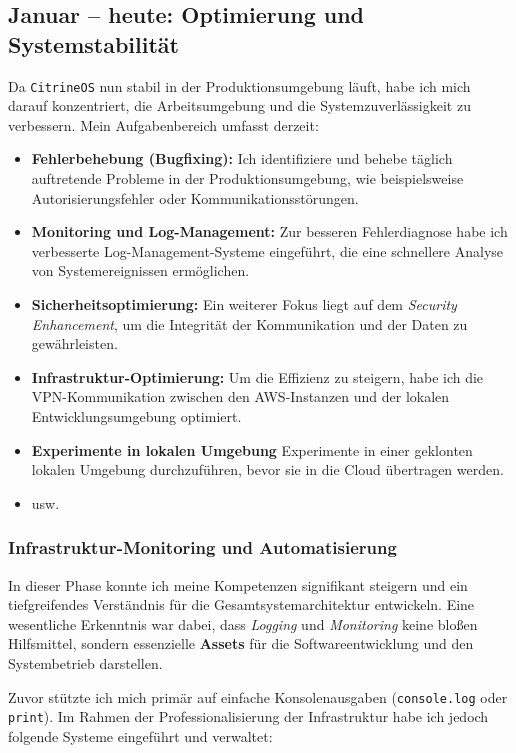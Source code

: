 \documentclass[12pt,a4paper]{report}
\begin{document}
\subsection{ Januar -- heute: Optimierung und Systemstabilität } 
Da \texttt{CitrineOS} nun stabil in der Produktionsumgebung läuft,
 habe ich mich darauf konzentriert, die Arbeitsumgebung und die Systemzuverlässigkeit zu verbessern.
    Mein Aufgabenbereich umfasst derzeit: 
    \begin{itemize} 
        \item \textbf{Fehlerbehebung (Bugfixing):} Ich identifiziere und behebe täglich auftretende Probleme in der Produktionsumgebung, wie beispielsweise Autorisierungsfehler oder Kommunikationsstörungen. 
        \item \textbf{Monitoring und Log-Management:} Zur besseren Fehlerdiagnose habe ich verbesserte Log-Management-Systeme eingeführt, die eine schnellere Analyse von Systemereignissen ermöglichen. 
        \item \textbf{Sicherheitsoptimierung:} Ein weiterer Fokus liegt auf dem \textit{Security Enhancement}, um die Integrität der Kommunikation und der Daten zu gewährleisten. 
        \item \textbf{Infrastruktur-Optimierung:} Um die Effizienz zu steigern, habe ich die VPN-Kommunikation zwischen den AWS-Instanzen und der lokalen Entwicklungsumgebung optimiert. 
        \item \textbf{Experimente in lokalen Umgebung } Experimente in einer geklonten lokalen Umgebung durchzuführen, bevor sie in die Cloud übertragen werden. 
        \item usw.
    \end{itemize}

\subsubsection{Infrastruktur-Monitoring und Automatisierung}

In dieser Phase konnte ich meine Kompetenzen signifikant steigern und ein tiefgreifendes Verständnis für die Gesamtsystemarchitektur entwickeln. 
Eine wesentliche Erkenntnis war dabei, dass \textit{Logging} und \textit{Monitoring} keine bloßen Hilfsmittel, sondern essenzielle \textbf{Assets} für die Softwareentwicklung und den Systembetrieb darstellen. 

Zuvor stützte ich mich primär auf einfache Konsolenausgaben (\texttt{console.log} oder \texttt{print}). Im Rahmen der Professionalisierung der Infrastruktur habe ich jedoch folgende Systeme eingeführt und verwaltet:
\end{document}
